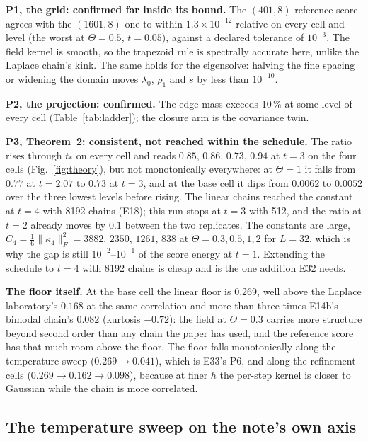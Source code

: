 \documentclass[10pt,a4paper]{article}
\newcommand{\Th}{\Theta}
\newcommand{\st}[1]{\textbf{#1}}
\theoremstyle{plain}
\theoremstyle{remark}
\begin{document}
\st{P1, the grid: confirmed far inside its bound.} The $(401,8)$ reference score agrees with the
$(1601,8)$ one to within $1.3\times10^{-12}$ relative on every cell and level (the worst at $\Th=0.5$, $t=0.05$), against a declared
tolerance of $10^{-3}$. The field kernel is smooth, so the trapezoid rule is spectrally accurate here,
unlike the Laplace chain's kink. The same holds for the eigensolve: halving the fine spacing or
widening the domain moves $\lambda_0$, $\rho_1$ and $s$ by less than $10^{-10}$.

\st{P2, the projection: confirmed.} The edge mass exceeds 10\,\% at some level of every cell
(Table~\ref{tab:ladder}); the closure arm is the covariance twin.

\st{P3, Theorem~2: consistent, not reached within the schedule.} The ratio rises through $t_*$ on
every cell and reads $0.85$, $0.86$, $0.73$, $0.94$ at $t=3$ on the four cells (Fig.~\ref{fig:theory}),
but not monotonically everywhere: at $\Th=1$ it falls from $0.77$ at $t=2.07$ to $0.73$ at $t=3$, and at
the base cell it dips from $0.0062$ to $0.0052$ over the three lowest levels before rising. The linear chains reached the constant at $t=4$ with 8192 chains (E18);
this run stops at $t=3$ with 512, and the ratio at $t=2$ already moves by $0.1$ between the two
replicates. The constants are large, $C_4=\tfrac16\|\kappa_4\|_F^2=3882$, $2350$, $1261$, $838$ at
$\Th=0.3,0.5,1,2$ for $L=32$, which is why the gap is still $10^{-2}$--$10^{-1}$ of the score energy
at $t=1$. Extending the schedule to $t=4$ with 8192 chains is cheap and is the one addition E32 needs.

\st{The floor itself.} At the base cell the linear floor is $0.269$, well above the Laplace
laboratory's $0.168$ at the same correlation and more than three times E14b's bimodal chain's
$0.082$ (kurtosis $-0.72$): the field at $\Th=0.3$ carries more structure beyond second order than
any chain the paper has used, and the reference score has that much room above the floor. The floor
falls monotonically along the temperature sweep ($0.269\to0.041$), which is E33's P6, and along the
refinement cells ($0.269\to0.162\to0.098$), because at finer $h$ the per-step kernel is closer to
Gaussian while the chain is more correlated.

\subsection{The temperature sweep on the note's own axis}\label{sec:fixedh}
\end{document}
